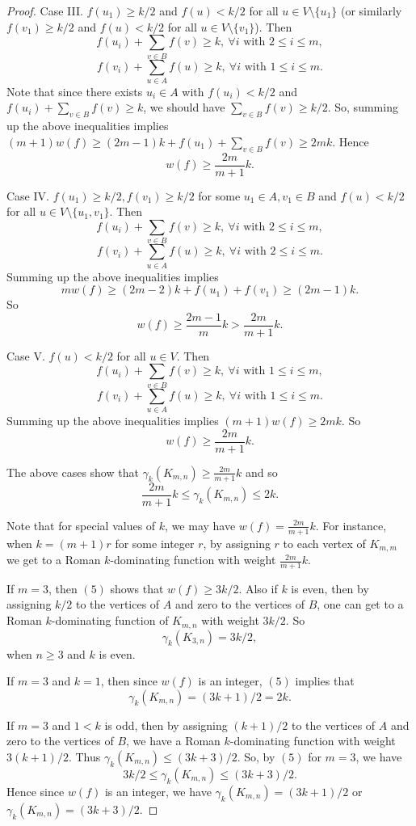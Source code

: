 \documentclass[10pt,a4paper]{amsart}
\begin{document}
\begin{proof}
Case III. $f(u_1)\geq k/2$ and $f(u)<k/2$ for all $u\in V\setminus \{u_1\}$ (or similarly $f(v_1)\geq k/2$ and $f(u)<k/2$ for all $u\in V\setminus \{v_1\}$). Then 
$$f(u_i)+\sum_{v\in B}f(v)\geq k, \ \forall i \textrm{ with }   2\leq i \leq m,$$
$$f(v_i)+\sum_{u\in A}f(u)\geq k, \ \forall i \textrm{ with }  1\leq i \leq m.$$ 
Note that since there exists $u_i\in A$ with $f(u_i)<k/2$ and $f(u_i)+\sum_{v\in B}f(v)\geq k$, we should have $\sum_{v\in B}f(v)\geq k/2$. So, summing up the above inequalities implies $(m+1)w(f)\geq (2m-1)k+f(u_1)+\sum_{v\in B}f(v)\geq 2mk$. Hence
$$w(f)\geq \frac{2m}{m+1}k.$$

Case IV. $f(u_1)\geq k/2, f(v_1)\geq k/2$ for some $u_1\in A, v_1\in B$ and $f(u)<k/2$ for all $u\in V\setminus \{u_1, v_1\}$. Then
$$f(u_i)+\sum_{v\in B}f(v)\geq k, \ \forall i \textrm{ with }  2\leq i \leq m,$$
$$f(v_i)+\sum_{u\in A}f(u)\geq k, \ \forall i \textrm{ with }  2\leq i \leq m.$$
Summing up the above inequalities implies 
$$mw(f)\geq (2m-2)k+f(u_1)+f(v_1)\geq (2m-1)k.$$
So
$$w(f)\geq \frac{2m-1}{m}k> \frac{2m}{m+1}k.$$

Case V. $f(u)<k/2$ for all $u\in V$. Then 
$$f(u_i)+\sum_{v\in B}f(v)\geq k, \ \forall i \textrm{ with }  1\leq i \leq m,$$
$$f(v_i)+\sum_{u\in A}f(u)\geq k, \ \forall i \textrm{ with }  1\leq i \leq m.$$
Summing up the above inequalities implies $(m+1)w(f)\geq 2mk$. So
$$w(f)\geq \frac{2m}{m+1}k.$$

The above cases show that $\gamma_k(K_{m,n})\geq \frac{2m}{m+1}k$ and so 
\begin{equation}
\frac{2m}{m+1}k \leq \gamma_k(K_{m,n})\leq 2k.
\end{equation}

Note that for special values of $k$, we may have $w(f)=\frac{2m}{m+1}k$. For instance, when $k=(m+1)r$ for some integer $r$, by assigning $r$ to each vertex of $K_{m,m}$ we get to a Roman $k$-dominating function with weight $\frac{2m}{m+1}k$.

If $m=3$, then $(5)$ shows that $w(f)\geq 3k/2$. Also if $k$ is even, then by assigning $k/2$ to the vertices of $A$ and zero to the vertices of $B$, one can get to a  Roman $k$-dominating function of $K_{m,n}$ with weight $3k/2$. So 
$$\gamma_k(K_{3,n})=3k/2,$$
when $n\geq 3$ and $k$ is even.

If $m=3$ and $k=1$, then since $w(f)$ is an integer, $(5)$ implies that 
$$\gamma_k(K_{m,n})=(3k+1)/2=2k.$$

If $m=3$ and $1<k$ is odd, then by assigning $(k+1)/2$ to the vertices of $A$ and zero to the vertices of $B$, we have a Roman $k$-dominating function with weight $3(k+1)/2$. Thus $\gamma_k(K_{m,n}) \leq (3k+3)/2 $. So, by $(5)$  for $m=3$, we have 
$$3k/2 \leq \gamma_k(K_{m,n})\leq (3k+3)/2.$$
 Hence since $w(f)$ is an integer, we have $\gamma_k(K_{m,n})=(3k+1)/2$ or $\gamma_k(K_{m,n})=(3k+3)/2$. 


\end{proof}
\end{document}
